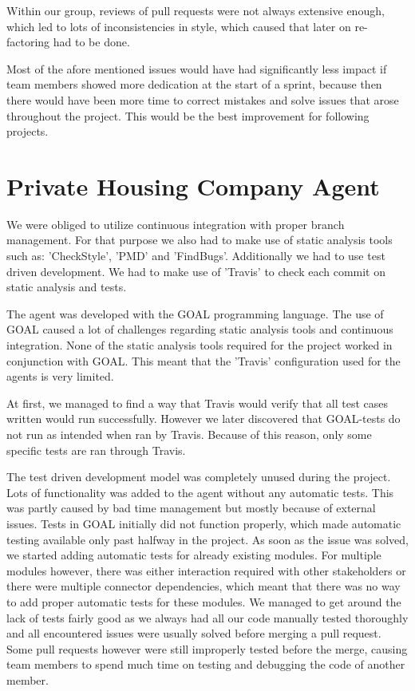 Within our group, reviews of pull requests were not always extensive enough, which led to lots of inconsistencies in style, which caused that later on re-factoring had to be done.

Most of the afore mentioned issues would have had significantly less impact if team members showed more dedication at the start of a sprint, because then there would have been more time to correct mistakes and solve issues that arose throughout the project. This would be the best improvement for following projects. 

\section{Private Housing Company Agent}
\label{sec:Private Housing Company Agent}

We were obliged to utilize continuous integration with proper branch management. For that purpose we also had to make use of static analysis tools such as: 'CheckStyle', 'PMD' and 'FindBugs'. Additionally we had to use test driven development. We had to make use of 'Travis' to check each commit on static analysis and tests. 

The agent was developed with the GOAL programming language. The use of GOAL caused a lot of challenges regarding static analysis tools and continuous integration. None of the static analysis tools required for the project worked in conjunction with GOAL. This meant that the 'Travis' configuration used for the agents is very limited.

At first, we managed to find a way that Travis would verify that all test cases written would run successfully. However we later discovered that GOAL-tests do not run as intended when ran by Travis. 
Because of this reason, only some specific tests are ran through Travis. 

The test driven development model was completely unused during the project. Lots of functionality was added to the agent without any automatic tests. This was partly caused by bad time management but mostly because of external issues. Tests in GOAL initially did not function properly, which made automatic testing available only past halfway in the project. As soon as the issue was solved, we started adding automatic tests for already existing modules. For multiple modules however, there was either interaction required with other stakeholders or there were multiple connector dependencies, which meant that there was no way to add proper automatic tests for these modules. We managed to get around the lack of tests fairly good as we always had all our code manually tested thoroughly and all encountered issues were usually solved before merging a pull request. Some pull requests however were still improperly tested before the merge, causing team members to spend much time on testing and debugging the code of another member. 

